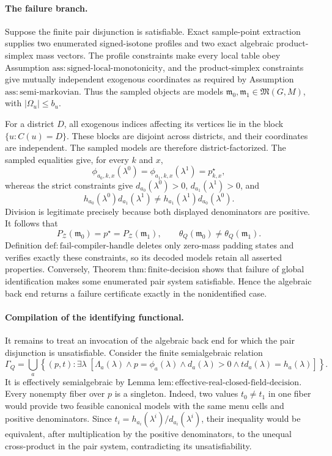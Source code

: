 \paragraph{The failure branch.}
Suppose the finite pair disjunction is satisfiable.  Exact sample-point extraction supplies two enumerated signed-isotone profiles and two exact algebraic product-simplex mass vectors.  The profile constraints make every local table obey Assumption \(\mathrm{ass:signed\text{-}local\text{-}monotonicity}\), and the product-simplex constraints give mutually independent exogenous coordinates as required by Assumption \(\mathrm{ass:semi\text{-}markovian}\).  Thus the sampled objects are models \(\mathfrak m_0,\mathfrak m_1\in\mathfrak M(G,M)\), with \(|\Omega_u|\le b_u\).

For a district \(D\), all exogenous indices affecting its vertices lie in the block \(\{u:C(u)=D\}\).  These blocks are disjoint across districts, and their coordinates are independent.  The sampled models are therefore district-factorized.  The sampled equalities give, for every \(k\) and \(x\),
\[
 \phi_{a_0,k,x}(\lambda^0)
 =\phi_{a_1,k,x}(\lambda^1)
 =p^{\star}_{k,x},
\]
whereas the strict constraints give \(d_{a_0}(\lambda^0)>0\), \(d_{a_1}(\lambda^1)>0\), and
\[
 h_{a_0}(\lambda^0)d_{a_1}(\lambda^1)
 \ne
 h_{a_1}(\lambda^1)d_{a_0}(\lambda^0).
\]
Division is legitimate precisely because both displayed denominators are positive.  It follows that
\[
 P_{\mathcal Z}(\mathfrak m_0)=p^{\star}
 =P_{\mathcal Z}(\mathfrak m_1),
 \qquad
 \theta_Q(\mathfrak m_0)\ne\theta_Q(\mathfrak m_1).
\]
Definition \(\mathrm{def:fail\text{-}compiler\text{-}handle}\) deletes only zero-mass padding states and verifies exactly these constraints, so its decoded models retain all asserted properties.  Conversely, Theorem \(\mathrm{thm:finite\text{-}decision}\) shows that failure of global identification makes some enumerated pair system satisfiable.  Hence the algebraic back end returns a failure certificate exactly in the nonidentified case.

\paragraph{Compilation of the identifying functional.}
It remains to treat an invocation of the algebraic back end for which the pair disjunction is unsatisfiable.  Consider the finite semialgebraic relation
\[
 \Gamma_Q
 =\bigcup_a\left\{(p,t):
 \exists\lambda\;\left[
 \Lambda_a(\lambda)\wedge p=\phi_a(\lambda)
 \wedge d_a(\lambda)>0
 \wedge t d_a(\lambda)=h_a(\lambda)
 \right]\right\}.
\]
It is effectively semialgebraic by Lemma \(\mathrm{lem:effective\text{-}real\text{-}closed\text{-}field\text{-}decision}\).  Every nonempty fiber over \(p\) is a singleton.  Indeed, two values \(t_0\ne t_1\) in one fiber would provide two feasible canonical models with the same menu cells and positive denominators.  Since \(t_i=h_{a_i}(\lambda^i)/d_{a_i}(\lambda^i)\), their inequality would be equivalent, after multiplication by the positive denominators, to the unequal cross-product in the pair system, contradicting its unsatisfiability.

